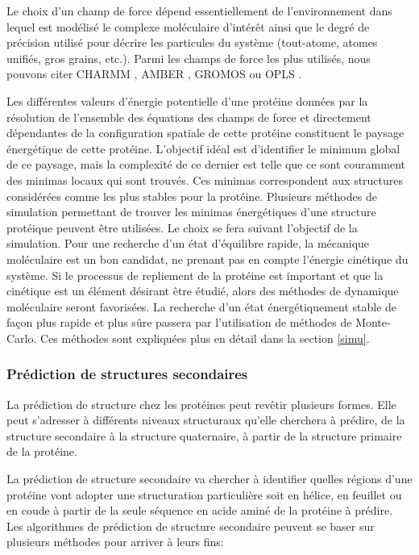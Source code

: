 Le choix d'un champ de force dépend essentiellement de l'environnement dans lequel est modélisé le complexe moléculaire d'intérêt ainsi que le degré de précision utilisé pour décrire les particules du système (tout-atome, atomes unifiés, gros grains, etc.). Parmi les champs de force les plus utilisés, nous pouvons citer CHARMM \cite{brooks2009charmm}, AMBER \cite{pearlman1995amber}, GROMOS \cite{oostenbrink2004biomolecular} ou OPLS \cite{jorgensen1996development}.

Les différentes valeurs d'énergie potentielle d'une protéine données par la résolution de l'ensemble des équations des champs de force et directement dépendantes de la configuration spatiale de cette protéine constituent le paysage énergétique de cette protéine. L’objectif idéal est d'identifier le minimum global de ce paysage, mais la complexité de ce dernier est telle que ce sont couramment des minimas locaux qui sont trouvés. Ces minimas correspondent aux structures considérées comme les plus stables pour la protéine. Plusieurs méthodes de simulation permettant de trouver les minimas énergétiques d'une structure protéique peuvent être utilisées. Le choix se fera suivant l'objectif de la simulation. Pour une recherche d'un état d'équilibre rapide, la mécanique moléculaire est un bon candidat, ne prenant pas en compte l'énergie cinétique du système. Si le processus de repliement de la protéine est important et que la cinétique est un élément désirant être étudié, alors des méthodes de dynamique moléculaire seront favorisées. La recherche d'un état énergétiquement stable de façon plus rapide et plus sûre passera par l'utilisation de méthodes de Monte-Carlo. Ces méthodes sont expliquées plus en détail dans la section \ref{simu}. 

\subsubsection{Prédiction de structures secondaires} \label{prediction_struct_second}

La prédiction de structure chez les protéines peut revêtir plusieurs formes. Elle peut s'adresser à différents niveaux structuraux qu'elle cherchera à prédire, de la structure secondaire à la structure quaternaire, à partir de la structure primaire de la protéine.

La prédiction de structure secondaire va chercher à identifier quelles régions d'une protéine vont adopter une structuration particulière soit en hélice, en feuillet ou en coude à partir de la seule séquence en acide aminé de la protéine à prédire. Les algorithmes de prédiction de structure secondaire peuvent se baser sur plusieurs méthodes pour arriver à leurs fins:

